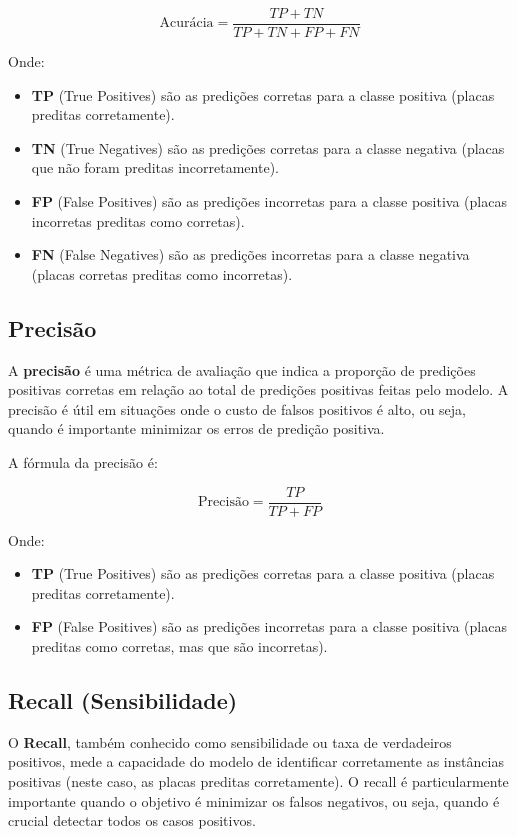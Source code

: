 \documentclass[conference]{IEEEtran}
\begin{document}
\[
\text{Acurácia} = \frac{TP + TN}{TP + TN + FP + FN}
\]

Onde:

\begin{itemize}
	\item \textbf{TP} (True Positives) são as predições corretas para a classe positiva (placas preditas corretamente).
	\item \textbf{TN} (True Negatives) são as predições corretas para a classe negativa (placas que não foram preditas incorretamente).
	\item \textbf{FP} (False Positives) são as predições incorretas para a classe positiva (placas incorretas preditas como corretas).
	\item \textbf{FN} (False Negatives) são as predições incorretas para a classe negativa (placas corretas preditas como incorretas).
\end{itemize}

\subsection{Precisão}

A \textbf{precisão} é uma métrica de avaliação que indica a proporção de predições positivas corretas em relação ao total de predições positivas feitas pelo modelo. A precisão é útil em situações onde o custo de falsos positivos é alto, ou seja, quando é importante minimizar os erros de predição positiva.

A fórmula da precisão é:

\[
\text{Precisão} = \frac{TP}{TP + FP}
\]

Onde:

\begin{itemize}
	\item \textbf{TP} (True Positives) são as predições corretas para a classe positiva (placas preditas corretamente).
	\item \textbf{FP} (False Positives) são as predições incorretas para a classe positiva (placas preditas como corretas, mas que são incorretas).
\end{itemize}

\subsection{Recall (Sensibilidade)}

O \textbf{Recall}, também conhecido como sensibilidade ou taxa de verdadeiros positivos, mede a capacidade do modelo de identificar corretamente as instâncias positivas (neste caso, as placas preditas corretamente). O recall é particularmente importante quando o objetivo é minimizar os falsos negativos, ou seja, quando é crucial detectar todos os casos positivos.
\end{document}
